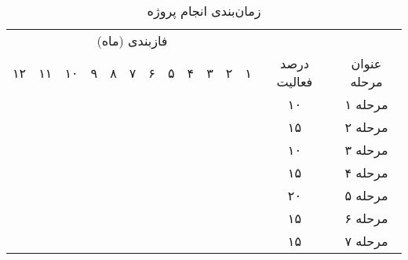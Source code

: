 \begin{table}[h]
	\centering
	\caption{زمان‌بندی انجام پروژه}
	\label{tab:Ganttchart}
	\begin{tabular}{cccccccccccccc}
		\multicolumn{12}{c}{فازبندی (ماه)} &  &  \\
		۱۲ & ۱۱ & ۱۰ & ۹ & ۸ & ۷ & ۶ & ۵ & ۴ & ۳ & ۲ & ۱ & \multirow{-2}{*}{درصد فعالیت} & \multirow{-2}{*}{عنوان مرحله} \\
		\cellcolor[HTML]{000000} & \cellcolor[HTML]{000000} & \cellcolor[HTML]{000000} & \cellcolor[HTML]{000000} & \cellcolor[HTML]{000000} & \cellcolor[HTML]{000000} & \cellcolor[HTML]{000000} & \cellcolor[HTML]{000000} & \cellcolor[HTML]{000000} & \cellcolor[HTML]{000000} & \cellcolor[HTML]{000000} & \cellcolor[HTML]{000000} & ۱۰ & مرحله ۱ \\
		\cellcolor[HTML]{000000} & \cellcolor[HTML]{000000} & \cellcolor[HTML]{000000} & \cellcolor[HTML]{000000} & \cellcolor[HTML]{000000} & \cellcolor[HTML]{000000} & \cellcolor[HTML]{000000} & \cellcolor[HTML]{000000} & \cellcolor[HTML]{000000} & \cellcolor[HTML]{000000} & \cellcolor[HTML]{000000} & \cellcolor[HTML]{000000} & ۱۵ & مرحله ۲ \\
		&  &  &  &  &  & \cellcolor[HTML]{000000} & \cellcolor[HTML]{000000} &  &  &  &  & ۱۰ & مرحله ۳ \\
		&  &  &  &  & \cellcolor[HTML]{000000} & \cellcolor[HTML]{000000} &  &  &  &  &  & ۱۵ & مرحله ۴ \\
		&  & \cellcolor[HTML]{000000} & \cellcolor[HTML]{000000} & \cellcolor[HTML]{000000} & \cellcolor[HTML]{000000} &  &  &  &  &  &  & ۲۰ & مرحله ۵ \\
		& \cellcolor[HTML]{000000} & \cellcolor[HTML]{000000} & \cellcolor[HTML]{000000} &  &  &  &  &  &  &  &  & ۱۵ & مرحله ۶ \\
		\cellcolor[HTML]{000000} & \cellcolor[HTML]{000000} & \cellcolor[HTML]{000000} &  &  &  &  &  &  &  &  &  & ۱۵ & مرحله ۷
	\end{tabular}
\end{table}